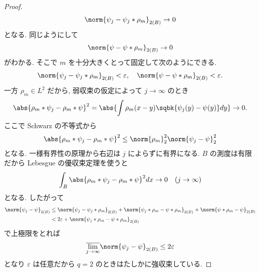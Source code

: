 \documentclass[openany, a4paper, oneside]{jsbook}
\begin{document}
\begin{proof}
\begin{align}
 \norm{\psi_j - \psi_j \ast \rho_m}_{2(B)} \to 0
\end{align}
となる.
同じようにして
\begin{align}
 \norm{\psi - \psi \ast \rho_m}_{2(B)} \to 0
\end{align}
がわかる.
そこで $m$ を十分大きくとって固定して次のようにできる.
\begin{align}
 \norm{\psi_j - \psi_j \ast \rho_m}_{2(B)}
 <
 \varepsilon,
 \quad
 \norm{\psi - \psi\ast \rho_m}_{2(B)}
 <
 \varepsilon.
\end{align}
一方 $\rho_m \in L^2$ だから, 弱収束の仮定によって $j \to \infty$ のとき
\begin{align}
 \abs{\rho_m \ast \psi_j - \rho_m \ast \psi}^2
 =
 \abs{\int \rho_m(x-y) \sqbk{\psi_j(y) - \psi(y)} dy} \to 0.
\end{align}
ここで Schwarz の不等式から
\begin{align}
 \abs{\rho_m \ast \psi_j - \rho_m \ast \psi}^2
 \leq
 \norm{\rho_m}_2^2 \norm{\psi_j - \psi}_2^2
\end{align}
となる.
一様有界性の原理から右辺は $j$ によらずに有界になる.
$B$ の測度は有限だから Lebesgue の優収束定理を使うと
\begin{align}
 \int_B \abs{\rho_m \ast \psi_j - \rho_m \ast \psi}^2 dx \to 0
 \quad (j \to \infty)
\end{align}
となる.
したがって
\begin{align}
 \norm{\psi_j - \psi}_{2(B)}
 &\leq
 \norm{\psi_j - \psi_j \ast \rho_m}_{2(B)} +
 \norm{\psi_j \ast \rho_m - \psi \ast \rho_m}_{2(B)} +
 \norm{\psi \ast \rho_m - \psi}_{2(B)} \\
 &<
 2 \varepsilon +
 \norm{\psi_j \ast \rho_m - \psi \ast \rho_m}_{2(B)}
\end{align}
で上極限をとれば
\begin{align}
 \overline{\lim_{j\to \infty}} \norm{\psi_j - \psi}_{2(B)}
 \leq
 2 \varepsilon
\end{align}
となり $\varepsilon$ は任意だから $q=2$ のときはたしかに強収束している.


\end{proof}
\end{document}
